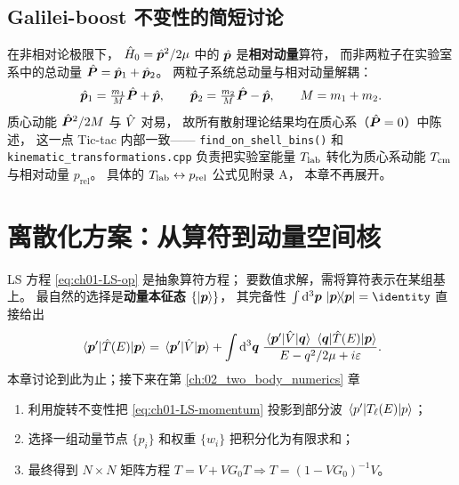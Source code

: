 \subsection{Galilei-boost 不变性的简短讨论}

在非相对论极限下，
$\hat{H}_0 = \hat{\bm{p}}^2/2\mu$ 中的 $\hat{\bm{p}}$ 是\textbf{相对动量}算符，
而非两粒子在实验室系中的总动量
$\hat{\bm{P}} = \hat{\bm{p}}_1 + \hat{\bm{p}}_2$。
两粒子系统总动量与相对动量解耦：
\begin{equation}
  \hat{\bm{p}}_1 = \tfrac{m_1}{M}\hat{\bm{P}} + \hat{\bm{p}}, \qquad
  \hat{\bm{p}}_2 = \tfrac{m_2}{M}\hat{\bm{P}} - \hat{\bm{p}}, \qquad
  M = m_1 + m_2.
  \label{eq:ch01-relative-mom}
\end{equation}
质心动能 $\hat{\bm{P}}^2/2M$ 与 $\hat{V}$ 对易，
故所有散射理论结果均在质心系（$\hat{\bm{P}} = 0$）中陈述，
这一点 Tic-tac 内部一致——
\texttt{find\_on\_shell\_bins()} 和 \texttt{kinematic\_transformations.cpp}
负责把实验室能量 ${T_{\text{lab}}}$ 转化为质心系动能 ${T_{\text{cm}}}$ 与相对动量 $p_{\text{rel}}$。
具体的 ${T_{\text{lab}}} \leftrightarrow p_{\text{rel}}$ 公式见附录 A，
本章不再展开。

\section{离散化方案：从算符到动量空间核}
\label{sec:ch01-discrete}

LS 方程 \cref{eq:ch01-LS-op} 是抽象算符方程；
要数值求解，需将算符表示在某组基上。
最自然的选择是\textbf{动量本征态 $\{\ket{\bm{p}}\}$}，
其完备性
$\int \dd^3 \bvec{p}\, \ketbra{\bvec{p}}{\bvec{p}} = \identity$
直接给出
\begin{equation}
  \matrixel{\bvec{p}'}{\Top(E)}{\bvec{p}}
  = \matrixel{\bvec{p}'}{\Vop}{\bvec{p}}
   + \int \dd^3\bvec{q}\;
       \frac{\matrixel{\bvec{p}'}{\Vop}{\bvec{q}}\, \matrixel{\bvec{q}}{\Top(E)}{\bvec{p}}}
            {E - q^2/2\mu + i\eps}.
  \label{eq:ch01-LS-momentum}
\end{equation}
本章讨论到此为止；接下来在第 \ref{ch:02_two_body_numerics} 章
\begin{enumerate}
  \item 利用旋转不变性把 \cref{eq:ch01-LS-momentum} 投影到部分波 $\matrixel{p'}{T_{\ell}(E)}{p}$；
  \item 选择一组动量节点 $\{p_i\}$ 和权重 $\{w_i\}$ 把积分化为有限求和；
  \item 最终得到 $N \times N$ 矩阵方程 $T = V + V G_0 T \Rightarrow T = (1 - V G_0)^{-1} V$。
\end{enumerate}

